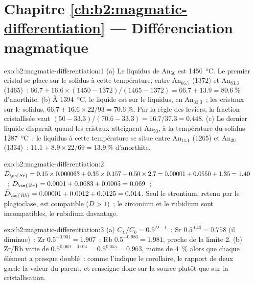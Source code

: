 \section*{Chapitre \ref{ch:b2:magmatic-differentiation} --- Différenciation magmatique}

\begin{solution}{exo:b2:magmatic-differentiation:1}
(a) Le liquidus de An$_{50}$ est \qty{1450}{\celsius}. Le premier cristal se place sur le
solidus à cette température, entre An$_{66.7}$ (1372) et An$_{83.3}$ (1465)~:
$66.7 + 16.6\times(1450 - 1372)/(1465 - 1372) = 66.7 + 13.9 = \qty{80.6}{\percent}$
d'anorthite. (b) À \qty{1394}{\celsius}, le liquide est sur le liquidus, en An$_{33.3}$~; les cristaux sur le solidus, $66.7 + 16.6\times22/93 =
\qty{70.6}{\percent}$. Par la règle des leviers, la fraction cristallisée vaut $(50 -
33.3)/(70.6 - 33.3) = 16.7/37.3 = 0.448$. (c) Le dernier liquide disparaît quand les
cristaux atteignent An$_{50}$, à la température du solidus \qty{1287}{\celsius}~;
le liquidus à cette température se situe entre An$_{11.1}$ (1265) et An$_{20}$ (1334)~:
$11.1 +
8.9\times22/69 = \qty{13.9}{\percent}$ d'anorthite.
\end{solution}

\begin{solution}{exo:b2:magmatic-differentiation:2}
$\bar D_{\ce{Sr}} = 0.15\times0.000063 + 0.35\times0.157 + 0.50\times2.7 = 0.00001 +
0.0550 + 1.35 = 1.40$~; $\bar D_{\ce{Zr}} = 0.0001 + 0.0683 + 0.0005 = 0.069$~;
$\bar D_{\ce{Rb}} = 0.00001 + 0.0012 + 0.0125 = 0.014$. Seul le strontium, retenu par le
plagioclase, est compatible ($\bar D > 1$)~; le zirconium et le rubidium sont incompatibles,
le rubidium davantage.
\end{solution}

\begin{solution}{exo:b2:magmatic-differentiation:3}
(a) $C_L/C_0 = 0.5^{D-1}$~: Sr $0.5^{0.40} = 0.758$ (il diminue)~; Zr $0.5^{-0.931} =
1.907$~; Rb $0.5^{-0.986} = 1.981$, proche de la limite 2. (b) Zr/Rb varie de
$0.5^{0.069 - 0.014} = 0.5^{0.055} = 0.963$, moins de \qty{4}{\percent} alors que chaque
élément a presque doublé~: comme l'indique le corollaire, le rapport de deux 
garde la valeur du  parent, et renseigne donc sur la source
plutôt que sur la cristallisation.
\end{solution}

